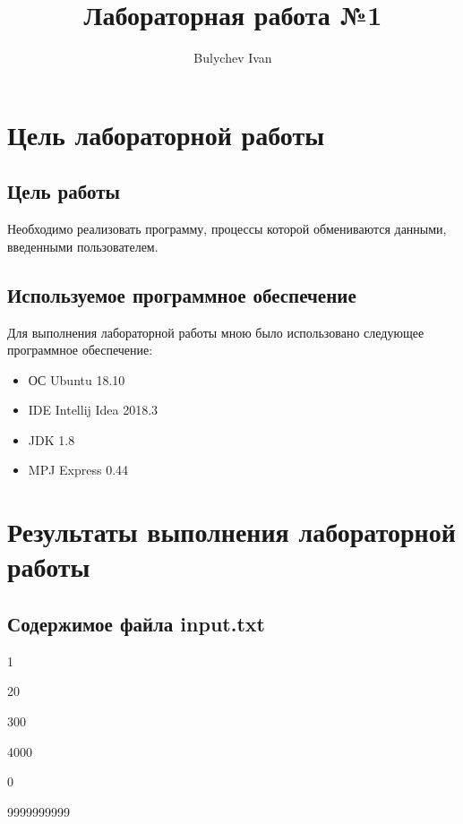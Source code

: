 \documentclass[titlepage,oneside,final,14pt]{extarticle} %
\author{Bulychev Ivan}
\title{Лабораторная работа №1}
\begin{document}
	

\setcounter{page}{2}

\section{Цель лабораторной работы}

\subsection{Цель работы}

Необходимо реализовать программу, процессы которой обмениваются данными, введенными пользователем.

\subsection{Используемое программное обеспечение}

Для выполнения лабораторной работы мною было использовано следующее программное обеспечение:
\begin{itemize}
	\item ОС Ubuntu 18.10
	\item IDE Intellij Idea 2018.3
	\item JDK 1.8
	\item MPJ Express 0.44
\end{itemize}

\section{Результаты выполнения лабораторной работы}

\subsection{Содержимое файла input.txt}

\ttfamily

1

20

300

4000

0

9999999999


\normalfont
\end{document}
